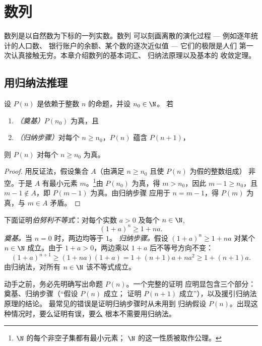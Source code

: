 \chapter{数列}\label{ch:g12:seq}

数列是以自然数为下标的一列实数。数列
可以刻画离散的演化过程 --- 例如逐年统计的人口数、
银行账户的余额、某个数的逐次近似值 --- 它们的极限是人们
第一次认真接触无穷。本章介绍数列的基本词汇、
归纳法原理以及基本的
收敛定理。

\section{用归纳法推理}

\begin{theorem}[归纳法原理]\label{thm:g12:seq:induction}
设 $P(n)$ 是依赖于整数 $n$ 的命题，并设 $n_0 \in \N$。
若
\begin{enumerate}
  \item \emph{（奠基）}$P(n_0)$ 为真，且
  \item \emph{（归纳步骤）}对每个 $n \geq n_0$，$P(n)$ 蕴含 $P(n+1)$，
\end{enumerate}
则 $P(n)$ 对每个 $n \geq n_0$ 为真。
\end{theorem}

\begin{proof}
用反证法，假设集合 $A$（由满足 $n \geq n_0$ 且使 $P(n)$ 为假的整数组成）
非空。于是 $A$ 有最小元素
$m$。\footnote{$\N$ 的每个非空子集都有最小元素；
$\N$ 的这一性质被取作公理。}由 $P(n_0)$ 为真，得 $m > n_0$，因此
$m - 1 \geq n_0$，且 $m-1 \notin A$，即 $P(m-1)$ 为真。由归纳步骤
应用于 $n = m-1$，得 $P(m)$ 为真，与
$m \in A$ 矛盾。
\end{proof}

\begin{example}\label{ex:g12:seq:bernoulli}
下面证明\emph{伯努利不等式}：对每个实数 $a > 0$ 及每个
$n \in \N$,
\[
(1+a)^n \geq 1 + na.
\]
\emph{奠基。}当 $n = 0$ 时，两边均等于 $1$。
\emph{归纳步骤。}假设 $(1+a)^n \geq 1+na$ 对某个 $n \in \N$ 成立。由于
$1 + a > 0$，两边乘以 $1+a$ 后不等号方向不变：
\[
(1+a)^{n+1} \geq (1+na)(1+a) = 1 + (n+1)a + na^2 \geq 1 + (n+1)a .
\]
由归纳法，对所有 $n \in \N$ 该不等式成立。
\end{example}

\begin{method}[归纳法证明的写法]\label{met:g12:seq:induction}
动手之前，务必先明确写出命题 $P(n)$。一个完整的证明
应明显包含三个部分：奠基、归纳步骤（“假设 $P(n)$ 成立；
证明 $P(n+1)$ 成立”），以及援引归纳法原理的结论。
最常见的错误是证明归纳步骤时从未用到
归纳假设 $P(n)$。出现这种情况时，要么证明有误，要么
根本不需要用归纳法。
\end{method}

